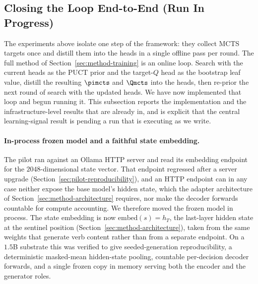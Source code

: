 \subsection{Closing the Loop End-to-End (Run In Progress)}
\label{sec:pilot-closedloop}

The experiments above isolate one step of the framework: they collect MCTS
targets once and distill them into the heads in a single offline pass per
round. The full method of Section~\ref{sec:method-training} is an online loop.
Search with the current heads as the PUCT prior and the target-$Q$ head as the
bootstrap leaf value, distill the resulting $\pimcts$ and $\Qmcts$ into the
heads, then re-prior the next round of search with the updated heads. We have
now implemented that loop and begun running it. This subsection reports the
implementation and the infrastructure-level results that are already in, and is
explicit that the central learning-signal result is pending a run that is
executing as we write.

\paragraph{In-process frozen model and a faithful state embedding.}
The pilot ran against an Ollama HTTP server and read its embedding endpoint for
the $2048$-dimensional state vector. That endpoint regressed after a server
upgrade (Section~\ref{sec:pilot-reproducibility}), and an HTTP endpoint can in
any case neither expose the base model's hidden state, which the adapter
architecture of Section~\ref{sec:method-architecture} requires, nor make the
decoder forwards countable for compute accounting. We therefore moved the
frozen model in process. The state embedding is now $\mathrm{embed}(s) = h_T$,
the last-layer hidden state at the sentinel position
(Section~\ref{sec:method-architecture}), taken from the same weights that
generate verb content rather than from a separate endpoint. On a $1.5$B
substrate this was verified to give seeded-generation reproducibility, a
deterministic masked-mean hidden-state pooling, countable per-decision decoder
forwards, and a single frozen copy in memory serving both the encoder and the
generator roles.

